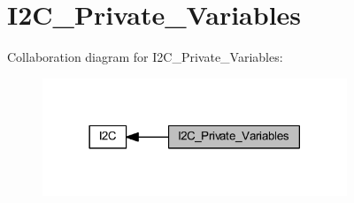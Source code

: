 \hypertarget{group___i2_c___private___variables}{}\section{I2\+C\+\_\+\+Private\+\_\+\+Variables}
\label{group___i2_c___private___variables}
Collaboration diagram for I2\+C\+\_\+\+Private\+\_\+\+Variables\+:
\nopagebreak
\begin{figure}[H]
\begin{center}
\leavevmode
\includegraphics[width=258pt]{group___i2_c___private___variables}
\end{center}
\end{figure}
